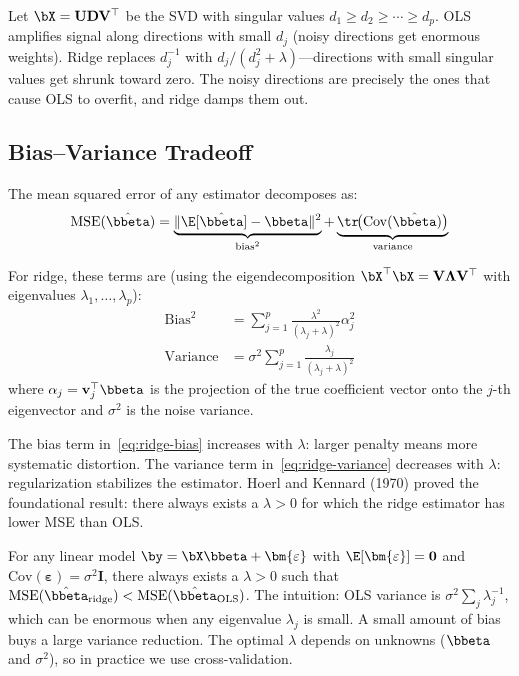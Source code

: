 \begin{intuition}
Let $\bX = \mathbf{U} \mathbf{D} \mathbf{V}^\top$ be the SVD with singular values $d_1 \geq d_2 \geq \cdots \geq d_p$.
OLS amplifies signal along directions with small $d_j$ (noisy directions get enormous weights).
Ridge replaces $d_j^{-1}$ with $d_j / (d_j^2 + \lambda)$---directions with small singular values get shrunk toward zero.
The noisy directions are precisely the ones that cause OLS to overfit, and ridge damps them out.
\end{intuition}

\subsection{Bias--Variance Tradeoff}

The mean squared error of any estimator decomposes as:
\begin{equation}
\mathrm{MSE}(\hat{\bbeta}) = \underbrace{\| \E[\hat{\bbeta}] - \bbeta \|^2}_{\text{bias}^2} + \underbrace{\tr\!\big(\mathrm{Cov}(\hat{\bbeta})\big)}_{\text{variance}}
\label{eq:bias-variance}
\end{equation}

For ridge, these terms are (using the eigendecomposition $\bX^\top\bX = \mathbf{V}\mathbf{\Lambda}\mathbf{V}^\top$ with eigenvalues $\lambda_1, \ldots, \lambda_p$):
\begin{align}
\text{Bias}^2 &= \sum_{j=1}^p \frac{\lambda^2}{(\lambda_j + \lambda)^2} \alpha_j^2 \label{eq:ridge-bias} \\[4pt]
\text{Variance} &= \sigma^2 \sum_{j=1}^p \frac{\lambda_j}{(\lambda_j + \lambda)^2} \label{eq:ridge-variance}
\end{align}
where $\alpha_j = \mathbf{v}_j^\top \bbeta$ is the projection of the true coefficient vector onto the $j$-th eigenvector and $\sigma^2$ is the noise variance.

The bias term in~\eqref{eq:ridge-bias} increases with $\lambda$: larger penalty means more systematic distortion.
The variance term in~\eqref{eq:ridge-variance} decreases with $\lambda$: regularization stabilizes the estimator.
Hoerl and Kennard (1970) proved the foundational result: there always exists a $\lambda > 0$ for which the ridge estimator has lower MSE than OLS.

\begin{keyresult}
For any linear model $\by = \bX\bbeta + \bm{\varepsilon}$ with $\E[\bm{\varepsilon}] = \mathbf{0}$ and $\mathrm{Cov}(\bm{\varepsilon}) = \sigma^2 \mathbf{I}$, there always exists a $\lambda > 0$ such that $\mathrm{MSE}(\hat{\bbeta}_{\mathrm{ridge}}) < \mathrm{MSE}(\hat{\bbeta}_{\mathrm{OLS}})$.
The intuition: OLS variance is $\sigma^2 \sum_j \lambda_j^{-1}$, which can be enormous when any eigenvalue $\lambda_j$ is small.
A small amount of bias buys a large variance reduction.
The optimal $\lambda$ depends on unknowns ($\bbeta$ and $\sigma^2$), so in practice we use cross-validation.
\end{keyresult}

